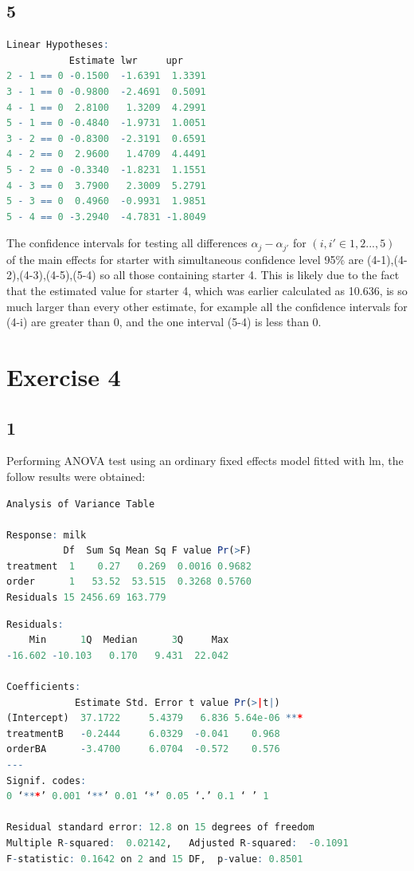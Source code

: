 \documentclass{article}
\begin{document}
    \subsection*{5}
      \begin{lstlisting}[language=R]
Linear Hypotheses:
           Estimate lwr     upr    
2 - 1 == 0 -0.1500  -1.6391  1.3391
3 - 1 == 0 -0.9800  -2.4691  0.5091
4 - 1 == 0  2.8100   1.3209  4.2991
5 - 1 == 0 -0.4840  -1.9731  1.0051
3 - 2 == 0 -0.8300  -2.3191  0.6591
4 - 2 == 0  2.9600   1.4709  4.4491
5 - 2 == 0 -0.3340  -1.8231  1.1551
4 - 3 == 0  3.7900   2.3009  5.2791
5 - 3 == 0  0.4960  -0.9931  1.9851
5 - 4 == 0 -3.2940  -4.7831 -1.8049
      \end{lstlisting}
    The confidence intervals for testing all differences $\alpha_j - \alpha_{j'}$ for $(i,i' \in {1,2...,5})$ of the main effects for starter with simultaneous confidence level 95\% are (4-1),(4-2),(4-3),(4-5),(5-4) so all those containing starter 4. This is likely due to the fact that the estimated value for starter 4, which was earlier calculated as 10.636, is so much larger than every other estimate, for example all the confidence intervals for (4-i) are greater than 0, and the one interval (5-4) is less than 0.
  \section*{Exercise 4}
    \subsection*{1}
    Performing ANOVA test using an ordinary fixed effects model fitted with lm, the follow results were obtained:
      \begin{lstlisting}[language=R]
      Analysis of Variance Table

Response: milk
          Df  Sum Sq Mean Sq F value Pr(>F)
treatment  1    0.27   0.269  0.0016 0.9682
order      1   53.52  53.515  0.3268 0.5760
Residuals 15 2456.69 163.779  
      \end{lstlisting}
      
      \begin{lstlisting}[language=R]
 Residuals:
    Min      1Q  Median      3Q     Max 
-16.602 -10.103   0.170   9.431  22.042 

Coefficients:
            Estimate Std. Error t value Pr(>|t|)    
(Intercept)  37.1722     5.4379   6.836 5.64e-06 ***
treatmentB   -0.2444     6.0329  -0.041    0.968    
orderBA      -3.4700     6.0704  -0.572    0.576    
---
Signif. codes:  
0 ‘***’ 0.001 ‘**’ 0.01 ‘*’ 0.05 ‘.’ 0.1 ‘ ’ 1

Residual standard error: 12.8 on 15 degrees of freedom
Multiple R-squared:  0.02142,	Adjusted R-squared:  -0.1091 
F-statistic: 0.1642 on 2 and 15 DF,  p-value: 0.8501   
    \end{lstlisting}
    
\end{document}

